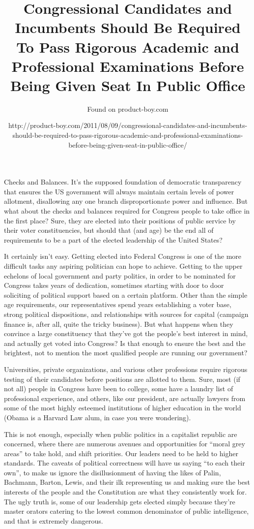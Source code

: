 \documentclass[11pt]{article}
\title{Congressional Candidates and Incumbents Should Be Required To Pass Rigorous Academic and Professional Examinations Before Being Given Seat In Public Office}
\author{Found on product-boy.com}
\date{http://product-boy.com/2011/08/09/congressional-candidates-and-incumbents-should-be-required-to-pass-rigorous-academic-and-professional-examinations-before-being-given-seat-in-public-office/}
\begin{document}
	\selectfont
	\maketitle

Checks and Balances. It’s the supposed foundation of democratic transparency that ensures the US government will always
maintain certain levels of power allotment, disallowing any one branch disproportionate power and influence.
But what about the checks and balances required for Congress people to take office in the first place? Sure, they are
elected into their positions of public service by their voter constituencies, but should that (and age) be the end all
of requirements to be a part of the elected leadership of the United States?

It certainly isn’t easy. Getting elected into Federal Congress is one of the more difficult tasks any aspiring
politician can hope to achieve. Getting to the upper echelons of local government and party politics, in order to be
nominated for Congress takes years of dedication, sometimes starting with door to door soliciting of political support
based on a certain platform. Other than the simple age requirements, our representatives spend years establishing a
voter base, strong political dispositions, and relationships with sources for capital (campaign finance is, after all,
quite the tricky business). But what happens when they convince a large constituency that they’ve got the people’s best
interest in mind, and actually get voted into Congress? Is that enough to ensure the best and the brightest, not to
mention the most qualified people are running our government?

Universities, private organizations, and various other professions require rigorous testing of their candidates before
positions are allotted to them. Sure, most (if not all) people in Congress have been to college, some have a laundry
list of professional experience, and others, like our president, are actually lawyers from some of the most highly
esteemed institutions of higher education in the world (Obama is a Harvard Law alum, in case you were wondering).

This is not enough, especially when public politics in a capitalist republic are concerned, where there are numerous
avenues and opportunities for “moral grey areas” to take hold, and shift priorities. Our leaders need to be held to
higher standards. The caveats of political correctness will have us saying “to each their own”, to make us ignore the
disillusionment of having the likes of Palin, Bachmann, Barton, Lewis, and their ilk representing us and making sure the
best interests of the people and the Constitution are what they consistently work for. The ugly truth is, some of our
leadership gets elected simply because they’re master orators catering to the lowest common denominator of public
intelligence, and that is extremely dangerous.
\end{document}
